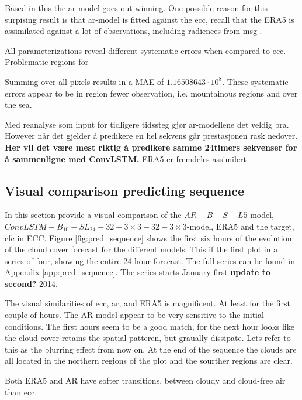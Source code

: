 Based in this the \acrshort{ar}-model goes out winning. One possible reason for this surpising result is that \acrshort{ar}-model is fitted against the \acrshort{ecc}, recall that 
the ERA5 is assimilated against a lot of observations, including radiences from \acrlong{msg} \cite{ERA52020}.

All parameterizations reveal different systematic errors when compared to \acrshort{ecc}. Problematic regions for 

Summing over all pixels results in a MAE of $1.16508643\cdot10^8$. These systematic errors appear to be in region fewer observation, i.e. mountainous regions and over the sea. %
%

Med reanalyse som input for tidligere tidssteg gjør ar-modellene det veldig bra. However når det gjelder å predikere en hel sekvens går prestasjonen rask nedover. \textbf{Her vil det være mest riktig å predikere samme 24timers sekvenser for å sammenligne med ConvLSTM.} ERA5 er fremdeles assimilert 


\subsection{Visual comparison predicting sequence}
In this section provide a visual comparison of the $AR-B-S-L5$-model, $ConvLSTM-B_{10}-SL_{24}-32-3\times3-32-3 \times3$-model, ERA5 and the target, \acrshort{cfc} in \acrshort{ECC}. Figure \ref{fig:pred_sequence} shows the first six hours of the evolution of the cloud cover forecast for the different models. This if the first plot in a series of four, showing the entire 24 hour forecast. The full series can be found in Appendix \ref{app:pred_sequence}. The series starts January first \textbf{update to second?} 2014.

The visual similarities of \acrshort{ecc}, \acrshort{ar}, and ERA5 is magnificent. At least for the first couple of hours. The AR model appear to be very sensitive to the initial conditions. The first hours seem to be a good match, for the next hour looks like the cloud cover retains the spatial patteren, but graually dissipate. Lets refer to this as the blurring effect from now on. At the end of the sequence the clouds are all located in the northern regions of the plot and the sourther regions are clear. 

Both ERA5 and AR have softer transitions, between cloudy and cloud-free air than \acrshort{ecc}.

